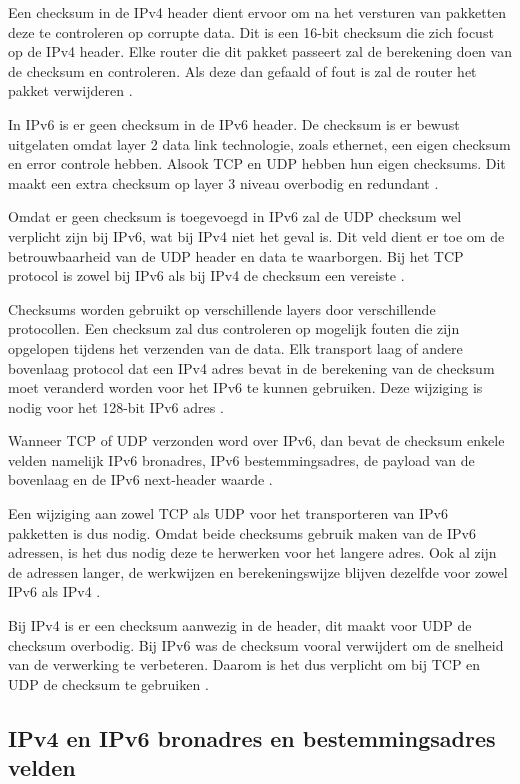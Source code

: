 Een checksum in de IPv4 header dient ervoor om na het versturen van pakketten deze te controleren op corrupte data. Dit is een 16-bit checksum die zich focust op de IPv4 header. Elke router die dit pakket passeert zal de berekening doen van de checksum en controleren. Als deze dan gefaald of fout is zal de router het pakket verwijderen \autocite{Graziani2017}.

In IPv6 is er geen checksum in de IPv6 header. De checksum is er bewust uitgelaten omdat layer 2 data link technologie, zoals ethernet, een eigen checksum en error controle hebben. Alsook TCP en UDP hebben hun eigen checksums. Dit maakt een extra checksum op layer 3 niveau overbodig en redundant \autocite{Graziani2017}.

Omdat er geen checksum is toegevoegd in IPv6 zal de UDP checksum wel verplicht zijn bij IPv6, wat bij IPv4 niet het geval is. Dit veld dient er toe om de betrouwbaarheid van de UDP header en data te waarborgen. Bij het TCP protocol is zowel bij IPv6 als bij IPv4 de checksum een vereiste \autocite{Graziani2017}.

Checksums worden gebruikt op verschillende layers door verschillende protocollen. Een checksum zal dus controleren op mogelijk fouten die zijn opgelopen tijdens het verzenden van de data. Elk transport laag of andere bovenlaag protocol dat een IPv4 adres bevat in de berekening van de checksum moet veranderd worden voor het IPv6 te kunnen gebruiken. Deze wijziging is nodig voor het 128-bit IPv6 adres \autocite{Graziani2017}.

Wanneer TCP of UDP verzonden word over IPv6, dan bevat de checksum enkele velden namelijk IPv6 bronadres, IPv6 bestemmingsadres, de payload van de bovenlaag en de IPv6 next-header waarde \autocite{Graziani2017}.

Een wijziging aan zowel TCP als UDP voor het transporteren van IPv6 pakketten is dus nodig. Omdat beide checksums gebruik maken van de IPv6 adressen, is het dus nodig deze te herwerken voor het langere adres. Ook al zijn de adressen langer, de werkwijzen en berekeningswijze blijven dezelfde voor zowel IPv6 als IPv4 \autocite{Graziani2017}.

Bij IPv4 is er een checksum aanwezig in de header, dit maakt voor UDP de checksum overbodig. Bij IPv6 was de checksum vooral verwijdert om de snelheid van de verwerking te verbeteren. Daarom is het dus verplicht om bij TCP en UDP de checksum te gebruiken \autocite{Graziani2017}.

\subsection{IPv4 en IPv6 bronadres en bestemmingsadres velden}

